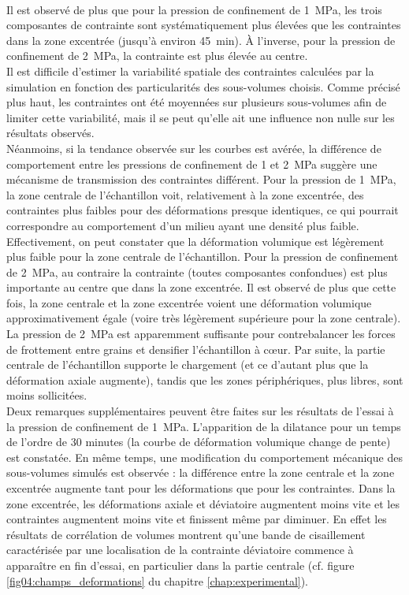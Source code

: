 	\\Il est observé de plus que pour la pression de confinement de \SI{1}{\mega\pascal}, les trois composantes de contrainte sont systématiquement plus élevées que les contraintes dans la zone excentrée (jusqu'à environ \SI{45}{\minute}). À l'inverse, pour la pression de confinement de \SI{2}{\mega\pascal}, la contrainte est plus élevée au centre.
	\\Il est difficile d'estimer la variabilité spatiale des contraintes calculées par la simulation en fonction des particularités des sous-volumes choisis. Comme précisé plus haut, les contraintes ont été moyennées sur plusieurs sous-volumes afin de limiter cette variabilité, mais il se peut qu'elle ait une influence non nulle sur les résultats observés.
	\\Néanmoins, si la tendance observée sur les courbes est avérée, la différence de comportement entre les pressions de confinement de \num{1} et \SI{2}{\mega\pascal} suggère une mécanisme de transmission des contraintes différent. Pour la pression de \SI{1}{\mega\pascal}, la zone centrale de l'échantillon voit, relativement à la zone excentrée, des contraintes plus faibles pour des déformations presque identiques, ce qui pourrait correspondre au comportement d'un milieu ayant une densité plus faible. Effectivement, on peut constater que la déformation volumique est légèrement plus faible pour la zone centrale de l'échantillon. Pour la pression de confinement de \SI{2}{\mega\pascal}, au contraire la contrainte (toutes composantes confondues) est plus importante au centre que dans la zone excentrée. Il est observé de plus que cette fois, la zone centrale et la zone excentrée voient une déformation volumique approximativement égale (voire très légèrement supérieure pour la zone centrale). La pression de \SI{2}{\mega\pascal} est apparemment suffisante pour contrebalancer les forces de frottement entre grains et densifier l'échantillon à c\oe{}ur. Par suite, la partie centrale de l'échantillon supporte le chargement (et ce d'autant plus que la déformation axiale augmente), tandis que les zones périphériques, plus libres, sont moins sollicitées.
	\\Deux remarques supplémentaires peuvent être faites sur les résultats de l'essai à la pression de confinement de \SI{1}{\mega\pascal}.
	L'apparition de la dilatance pour un temps de l'ordre de 30 minutes (la courbe de déformation volumique change de pente) est constatée. En même temps, une modification du comportement mécanique des sous-volumes simulés est observée : la différence entre la zone centrale et la zone excentrée augmente tant pour les déformations que pour les contraintes. Dans la zone excentrée, les déformations axiale et déviatoire augmentent moins vite et les contraintes augmentent moins vite et finissent même par diminuer. En effet les résultats de corrélation de volumes montrent qu'une bande de cisaillement caractérisée par une localisation de la contrainte déviatoire commence à apparaître en fin d'essai, en particulier dans la partie centrale (cf. figure \ref{fig04:champs_deformations} du chapitre \ref{chap:experimental}).
